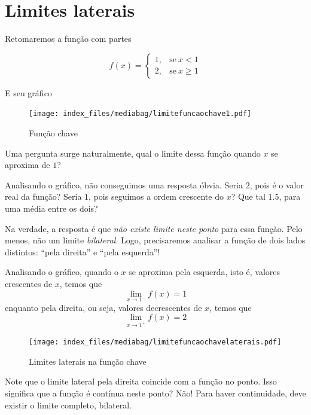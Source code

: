 \documentclass[
  portuguese,
  letterpaper,
  DIV=11,
  numbers=noendperiod]{scrreport}
\begin{document}
\section{Limites laterais}\label{limites-laterais}

Retomaremos a função com partes

\[
f(x) = \begin{cases}
1, & \mathrm{se}\ x < 1 \\
2, & \mathrm{se}\ x \geq 1
\end{cases}
\]

E seu gráfico

\begin{figure}[H]

\caption{Função chave}

{\centering \texttt{[image: index\_files/mediabag/limitefuncaochave1.pdf]}

}

\end{figure}%

Uma pergunta surge naturalmente, qual o limite dessa função quando \(x\)
se aproxima de \(1\)?

Analisando o gráfico, não conseguimos uma resposta óbvia. Seria \(2\),
pois é o valor real da função? Seria \(1\), pois seguimos a ordem
crescente do \(x\)? Que tal \(1.5\), para uma média entre os dois?

Na verdade, a resposta é que \emph{não existe limite neste ponto} para
essa função. Pelo menos, não um limite \emph{bilateral}. Logo,
precisaremos analisar a função de dois lados distintos: ``pela direita''
e ``pela esquerda''!

Analisando o gráfico, quando o \(x\) se aproxima pela esquerda, isto é,
valores crescentes de \(x\), temos que \[
\lim_{x \rightarrow 1^{-}} f(x) = 1
\] enquanto pela direita, ou seja, valores decrescentes de \(x\), temos
que \[
\lim_{x \rightarrow 1^{+}} f(x) = 2
\]

\begin{figure}[H]

\caption{Limites laterais na função chave}

{\centering \texttt{[image: index\_files/mediabag/limitefuncaochavelaterais.pdf]}

}

\end{figure}%

Note que o limite lateral pela direita coincide com a função no ponto.
Isso significa que a função é contínua neste ponto? Não! Para haver
continuidade, deve existir o limite completo, bilateral.
\end{document}
